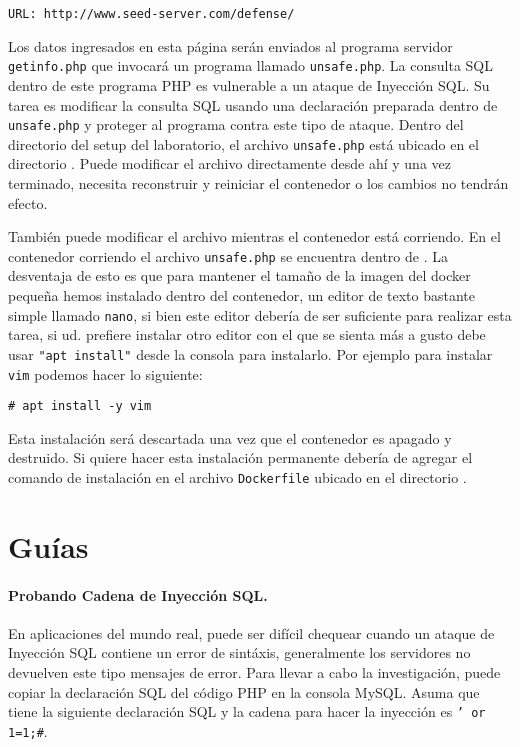 \begin{lstlisting}
URL: http://www.seed-server.com/defense/
\end{lstlisting}

Los datos ingresados en esta página serán enviados al programa servidor \texttt{getinfo.php} que invocará un programa llamado \texttt{unsafe.php}.
La consulta SQL dentro de este programa PHP es vulnerable a un ataque de Inyección SQL. Su tarea es modificar la consulta SQL usando una declaración preparada dentro de \texttt{unsafe.php} y proteger al programa contra este tipo de ataque.
Dentro del directorio del setup del laboratorio, el archivo \texttt{unsafe.php} está ubicado en el directorio . Puede modificar el archivo directamente desde ahí y una vez terminado, necesita reconstruir y reiniciar el contenedor o los cambios no tendrán efecto.

También puede modificar el archivo mientras el contenedor está corriendo.
En el contenedor corriendo el archivo \texttt{unsafe.php} se encuentra dentro de .
La desventaja de esto es que para mantener el tamaño de la imagen del docker pequeña hemos instalado dentro del contenedor, un editor de texto bastante simple llamado \texttt{nano}, si bien este editor debería de ser suficiente para realizar esta tarea, si ud. prefiere instalar otro editor con el que se sienta más a gusto debe usar \texttt{"apt install"} desde la consola para instalarlo. Por ejemplo para instalar \texttt{vim} podemos hacer lo siguiente:

\begin{lstlisting}
# apt install -y vim 
\end{lstlisting}

Esta instalación será descartada una vez que el contenedor es apagado y destruido.
Si quiere hacer esta instalación permanente debería de agregar el comando de instalación en el archivo \texttt{Dockerfile} ubicado en el directorio  . 


\section{Guías}
\label{sec:guidelines}

\paragraph{Probando Cadena de Inyección SQL.}
En aplicaciones del mundo real, puede ser difícil chequear cuando un ataque de Inyección SQL contiene un error de sintáxis, generalmente los servidores no devuelven este tipo mensajes de error.
Para llevar a cabo la investigación, puede copiar la declaración SQL del código PHP en la consola MySQL. Asuma que tiene la siguiente declaración SQL y la cadena para hacer la inyección es {\tt ' or 1=1;\#}. 

